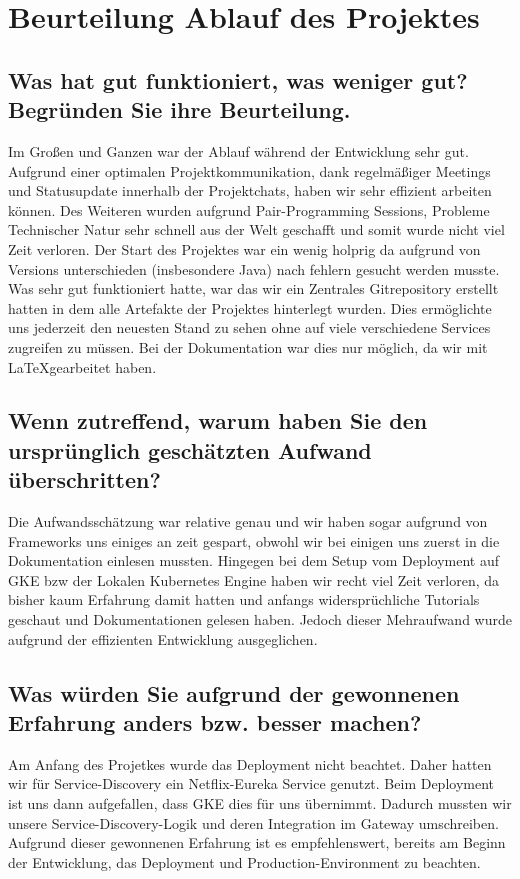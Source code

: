 \section{Beurteilung Ablauf des Projektes}

\subsection{Was hat gut funktioniert, was weniger gut? Begründen Sie ihre Beurteilung.}

Im Großen und Ganzen war der Ablauf während der Entwicklung sehr gut. Aufgrund einer optimalen Projektkommunikation, dank regelmäßiger Meetings und Statusupdate innerhalb der Projektchats, haben wir sehr effizient arbeiten können. Des Weiteren wurden aufgrund Pair-Programming Sessions, Probleme Technischer Natur sehr schnell aus der Welt geschafft und somit wurde nicht viel Zeit verloren. Der Start des Projektes war ein wenig holprig da aufgrund von Versions unterschieden (insbesondere Java) nach fehlern gesucht werden musste. Was sehr gut funktioniert hatte, war das wir ein Zentrales Gitrepository erstellt hatten in dem alle Artefakte der Projektes hinterlegt wurden. Dies ermöglichte uns jederzeit den neuesten Stand zu sehen ohne auf viele verschiedene Services zugreifen zu müssen. Bei der Dokumentation war dies nur möglich, da wir mit \LaTeX gearbeitet haben.

\subsection{Wenn zutreffend, warum haben Sie den ursprünglich geschätzten Aufwand überschritten?}

Die Aufwandsschätzung war relative genau und wir haben sogar aufgrund von Frameworks uns einiges an zeit gespart, obwohl wir bei einigen uns zuerst in die Dokumentation einlesen mussten. Hingegen bei dem Setup vom Deployment auf GKE bzw der Lokalen Kubernetes Engine haben wir recht viel Zeit verloren, da bisher kaum Erfahrung damit hatten und anfangs widersprüchliche Tutorials geschaut und Dokumentationen gelesen haben. Jedoch dieser Mehraufwand wurde aufgrund der effizienten Entwicklung ausgeglichen.

\subsection{Was würden Sie aufgrund der gewonnenen Erfahrung anders bzw. besser machen?}

Am Anfang des Projetkes wurde das Deployment nicht beachtet. Daher hatten wir für Service-Discovery ein Netflix-Eureka Service genutzt. Beim Deployment ist uns dann aufgefallen, dass GKE dies für uns übernimmt. Dadurch mussten wir unsere Service-Discovery-Logik und deren Integration im Gateway umschreiben. Aufgrund dieser gewonnenen Erfahrung ist es empfehlenswert, bereits am Beginn der Entwicklung, das Deployment und Production-Environment zu beachten. 
